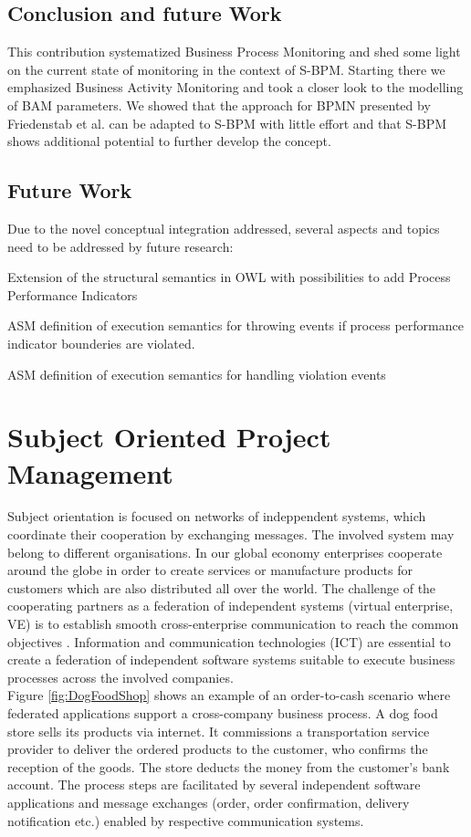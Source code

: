 \subsection {Conclusion and future Work}
This contribution systematized Business Process Monitoring and shed some light on the current state of monitoring in the context of S-BPM. Starting there we emphasized Business Activity Monitoring and took a closer look to the modelling of BAM parameters. We showed that the approach for BPMN presented by Friedenstab et al. can be adapted to S-BPM with little effort and that S-BPM shows additional potential to further develop the concept.
\\
\subsection{Future Work}

Due to the novel conceptual integration addressed, several aspects and topics need to be addressed by future research:
\begin{list}{-}{spacing}
	\item Extension of the structural semantics in OWL with possibilities to add Process Performance Indicators
	\item ASM definition of execution semantics for throwing events if process performance indicator bounderies are violated.
	\item ASM definition of execution semantics for handling violation events
\end{list}


\section{Subject Oriented Project Management}

Subject orientation is focused on networks of indeppendent systems, which coordinate their cooperation by exchanging messages. The involved system may belong to different organisations.
In our global economy enterprises cooperate around the globe in order to create services or manufacture products for customers which are also distributed all over the world. The challenge of the cooperating partners as a federation of independent systems (virtual enterprise, VE) is to establish smooth cross-enterprise communication to reach the common objectives \cite{article:VirtualEnterprise}. Information and communication technologies (ICT) are essential to create a federation of independent software systems suitable to execute business processes across the involved companies.
\\
Figure \ref{fig:DogFoodShop} shows an example of an order-to-cash scenario where federated applications support a cross-company business process. A dog food store sells its products via internet. It commissions a transportation service provider to deliver the ordered products to the customer, who confirms the reception of the goods. The store deducts the money from the customer's bank account. The process steps are facilitated by several independent software applications and message exchanges (order, order confirmation, delivery notification etc.) enabled by respective communication systems.


